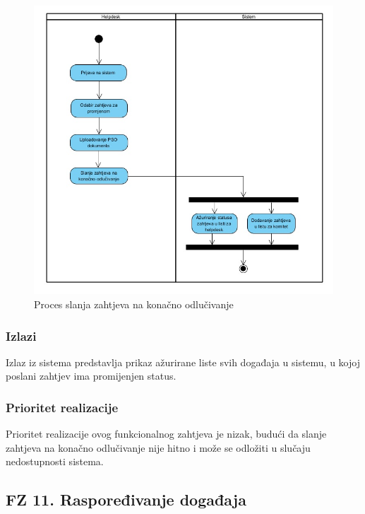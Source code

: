 \documentclass[12pt,a4paper]{article}
\begin{document}
\begin{figure}[H]
\center
\includegraphics[scale=0.5]{../res/Activity/activity10.JPG}
\caption{Proces slanja zahtjeva na konačno odlučivanje}
\label{act10}
\end{figure}

\subsubsection{Izlazi}

Izlaz iz sistema predstavlja prikaz ažurirane liste svih događaja u sistemu, u kojoj poslani zahtjev ima promijenjen status.

\subsubsection{Prioritet realizacije}

Prioritet realizacije ovog funkcionalnog zahtjeva je nizak, budući da slanje zahtjeva na konačno odlučivanje nije hitno i može se odložiti u slučaju nedostupnosti sistema.

\newpage

\subsection{FZ 11. Raspoređivanje događaja}
\end{document}
